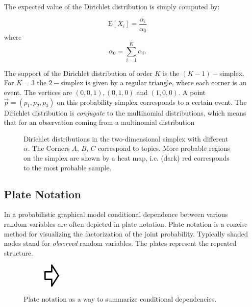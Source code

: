 \documentclass[a4paper,ngerman]{atseminar}
\newcommand*{\vinput}[1]{\vcenter{\hbox{}}}
\newcommand*{\vpointer}{\vcenter{\hbox{\scalebox{2}{\Huge\pointer}}}}
\begin{document}
The expected value of the Dirichlet distribution is simply computed by:

\begin{equation}
\mathrm{E}[X_i] = \frac{\alpha_i}{\alpha_0}
\end{equation}
where 
\begin{equation}
\alpha_0 = \sum_{i=1}^K\alpha_i.
\end{equation}


The support of the Dirichlet distribution of order $K$ is the $(K-1)-$simplex. For $K=3$ the $2-$simplex is given by a
regular triangle, where each corner is an event. The vertices are  $(0,0,1), (0,1,0)$ and $(1,0,0)$.
A point $\vec{p} = (p_1,p_2,p_3)$ on this probability simplex corresponds to a certain event.
The Dirichlet distribution is \textit{conjugate} to the multinomial distributions, which means that 
for an observation coming from a multinomial distribution


\begin{figure}[!tbp]
  \centering
  \hfill
  \hfill
  \hfill
  \caption{Dirichlet distributions in the two-dimensional simplex	 with different $\alpha$. The Corners $A$, $B$, $C$
  correspond to topics. More probable regions on the simplex are shown by a heat map, i.e. (dark) red corresponds to the
  most probable sample.}
\end{figure}



\subsection{Plate Notation}
In a probabilistic graphical model conditional dependence between various random variables are often depicted in plate notation.
Plate notation is a concise method for visualizing the factorization of the joint probability. 
Typically shaded nodes stand for \textit{observed} random variables.
The plates represent the repeated structure. 

\begin{figure}[H]
\centering
$\vinput{dependence_graph} \hspace{1cm }\vpointer  \hspace{1cm} \vinput{plate_dependence_graph}$
 \caption{Plate notation as a way to summarize conditional dependencies.}
  \label{fig:plate}
\end{figure}
\end{document}
